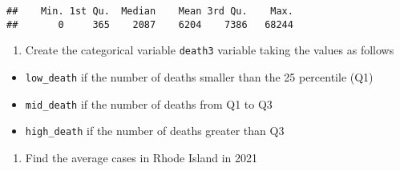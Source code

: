 \documentclass[
]{article}
\newenvironment{Shaded}{\begin{snugshade}}{\end{snugshade}}
\newcommand{\AttributeTok}[1]{\textcolor[rgb]{0.77,0.63,0.00}{#1}}
\newcommand{\ConstantTok}[1]{\textcolor[rgb]{0.00,0.00,0.00}{#1}}
\newcommand{\DecValTok}[1]{\textcolor[rgb]{0.00,0.00,0.81}{#1}}
\newcommand{\FunctionTok}[1]{\textcolor[rgb]{0.00,0.00,0.00}{#1}}
\newcommand{\NormalTok}[1]{#1}
\newcommand{\OtherTok}[1]{\textcolor[rgb]{0.56,0.35,0.01}{#1}}
\newcommand{\SpecialCharTok}[1]{\textcolor[rgb]{0.00,0.00,0.00}{#1}}
\newcommand{\StringTok}[1]{\textcolor[rgb]{0.31,0.60,0.02}{#1}}
\providecommand{\tightlist}{%
  \setlength{\itemsep}{0pt}\setlength{\parskip}{0pt}}
\begin{document}
\begin{Shaded}
\end{Shaded}

\begin{verbatim}
##    Min. 1st Qu.  Median    Mean 3rd Qu.    Max. 
##       0     365    2087    6204    7386   68244
\end{verbatim}

\begin{enumerate}
\def\labelenumi{\arabic{enumi}.}
\setcounter{enumi}{11}
\tightlist
\item
  Create the categorical variable \texttt{death3} variable taking the
  values as follows
\end{enumerate}

\begin{itemize}
\item
  \texttt{low\_death} if the number of deaths smaller than the 25
  percentile (Q1)
\item
  \texttt{mid\_death} if the number of deaths from Q1 to Q3
\item
  \texttt{high\_death} if the number of deaths greater than Q3
\end{itemize}

\begin{Shaded}
\end{Shaded}

\begin{enumerate}
\def\labelenumi{\arabic{enumi}.}
\setcounter{enumi}{12}
\tightlist
\item
  Find the average cases in Rhode Island in 2021
\end{enumerate}
\end{document}
